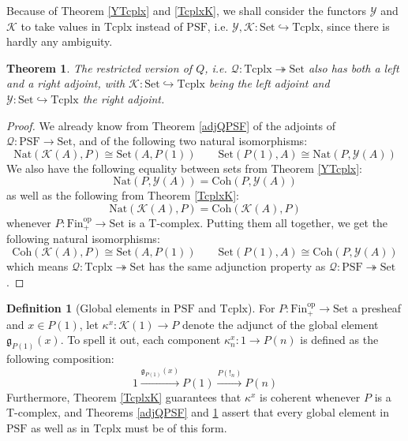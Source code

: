 \documentclass{article}
\newtheorem{theorem}{Theorem}[subsection]
\theoremstyle{remark}
\theoremstyle{definition}
\newtheorem{definition}{Definition}[subsection]
\newcommand{\Fin}{\mathrm{Fin}}
\newcommand{\Set}{\mathrm{Set}}
\newcommand{\PSF}{\mathrm{PSF}}
\newcommand{\op}{\mathrm{op}}
\newcommand{\Y}{\mathcal Y}
\newcommand{\K}{\mathcal K}
\newcommand{\g}{\mathfrak g}
\newcommand{\Tcplx}{\mathrm{Tcplx}}
\newcommand{\Q}{\mathcal Q}
\newcommand{\Nat}{\mathrm{Nat}}
\newcommand{\Coh}{\mathrm{Coh}}
\begin{document}
	Because of Theorem \ref{YTcplx} and \ref{TcplxK}, we shall consider the functors $\Y$ and $\K$ to take values in $\Tcplx$ instead of $\PSF$, i.e. $\Y,\K:\Set\hookrightarrow\Tcplx$, since there is hardly any ambiguity.
	\begin{theorem}\label{adjQT}
		The restricted version of $Q$, i.e. $\Q:\Tcplx\twoheadrightarrow\Set$ also has both a left and a right adjoint, with $\K:\Set\hookrightarrow\Tcplx$ being the left adjoint and $\Y:\Set\hookrightarrow\Tcplx$ the right adjoint.
	\end{theorem}
	\begin{proof}
		We already know from Theorem \ref{adjQPSF} of the adjoints of $\Q:\PSF\to\Set$, and of the following two natural isomorphisms:
		\[\Nat(\K(A),P)\cong\Set(A,P(1))\qquad\Set(P(1),A)\cong\Nat(P,\Y(A))\]
		We also have the following equality between sets from Theorem \ref{YTcplx}:
		\[\Nat(P,\Y(A))=\Coh(P,\Y(A))\]
		as well as the following from Theorem \ref{TcplxK}:
		\[\Nat(\K(A),P)=\Coh(\K(A),P)\]
		whenever $P:\Fin_+^\op\to\Set$ is a T-complex. Putting them all together, we get the following natural isomorphisms:
		\[\Coh(\K(A),P)\cong\Set(A,P(1))\qquad\Set(P(1),A)\cong\Coh(P,\Y(A))\]
		which means $\Q:\Tcplx\twoheadrightarrow\Set$ has the same adjunction property as $\Q:\PSF\twoheadrightarrow\Set$.
	\end{proof}
	\begin{definition}[Global elements in $\PSF$ and $\Tcplx$]
		For $P:\Fin_+^\op\to\Set$ a presheaf and $x\in P(1)$, let $\kappa^x:\K(1)\to P$ denote the adjunct of the global element $\g_{P(1)}(x)$. To spell it out, each component $\kappa^x_n:1\to P(n)$ is defined as the following composition:
		\[1\xrightarrow{\g_{P(1)}(x)}P(1)\xrightarrow{P(!_n)}P(n)\]
		Furthermore, Theorem \ref{TcplxK} guarantees that $\kappa^x$ is coherent whenever $P$ is a T-complex, and Theorems \ref{adjQPSF} and \ref{adjQT} assert that every global element in $\PSF$ as well as in $\Tcplx$ must be of this form.
	\end{definition}
\end{document}
